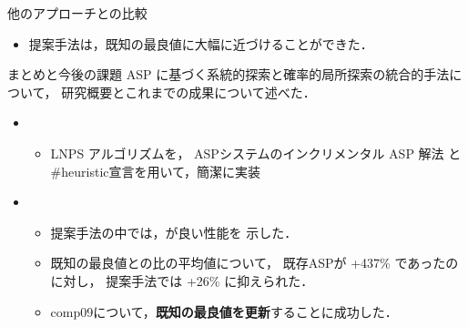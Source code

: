 \documentclass[11pt,dvipdfmx]{beamer}
\begin{document}
\begin{frame}{他のアプローチとの比較}
  \begin{center}
  \begin{tableB}
    
  \end{tableB}
  \end{center}
  \begin{itemize}
  \item 提案手法は，既知の最良値に大幅に近づけることができた． 
  \end{itemize}
\end{frame}
\begin{frame}{まとめと今後の課題}
  ASP に基づく系統的探索と確率的局所探索の統合的手法について，
  研究概要とこれまでの成果について述べた．

  \begin{itemize}
    \item {}
      \begin{itemize}
      \item LNPS アルゴリズムを，
        ASPシステム{\clingo}のインクリメンタル ASP 解法
        と\#heuristic宣言を用いて，簡潔に実装
      \end{itemize}
    \item {}
      \begin{itemize}
      \item 提案手法の中では，が良い性能を
        示した．
      \item 既知の最良値との比の平均値について，
      既存ASPが +437\% であったのに対し，
      提案手法では +26\% に抑えられた．
      \item \textsf{comp09}について，\alert{\bf 既知の最良値を更新}することに成功した．
      \end{itemize}
    \end{itemize}


\end{frame}
\end{document}
